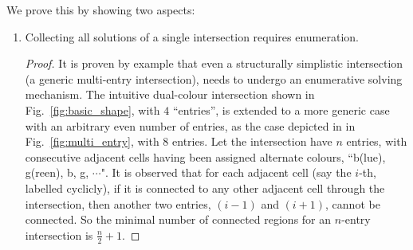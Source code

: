 \documentclass[journal]{IEEEtran}
\begin{document}
We prove this by showing two aspects:  
\begin{enumerate}
\item Collecting all solutions of a single intersection requires enumeration. 
\begin{proof}
It is proven by example that even a structurally simplistic intersection (a generic multi-entry intersection), needs  to undergo an enumerative solving mechanism. 
The intuitive dual-colour intersection shown in Fig.~\ref{fig:basic_shape}, with $4$ ``entries'', is extended to a more generic case with an arbitrary even number of entries, as the case depicted in in Fig.~\ref{fig:multi_entry}, with 8 entries. 
Let the intersection have $n$ %
entries, with consecutive adjacent cells having been assigned alternate colours, ``b(lue), g(reen), b, g, $\cdots$". 
It is observed that for each adjacent cell (say the $i$-th, labelled cyclicly), if it is connected to any other adjacent cell through the intersection, then another two entries, $(i-1)$ and $(i+1)$, cannot be connected. So the minimal number of connected regions for an $n$-entry intersection is $\frac{n}{2}+1$. %

\end{proof}
\end{enumerate}
\end{document}
